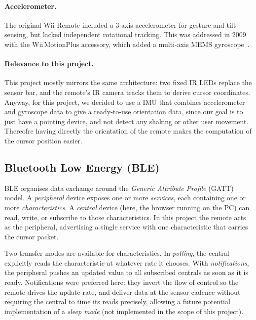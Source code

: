 \documentclass[12pt, a4paper]{article}
\begin{document}
\paragraph{Accelerometer.}
The original Wii Remote included a 3-axis accelerometer for gesture and tilt sensing, but lacked independent rotational tracking. This was addressed in 2009 with the Wii\,MotionPlus accessory, which added a multi-axis MEMS gyroscope~\cite{motionplus_wiki}. 

\paragraph{Relevance to this project.}
This project mostly mirrors the same architecture: two fixed IR LEDs replace the sensor bar, and the remote's IR camera tracks them to derive cursor coordinates. Anyway, for this project, we decided to use a IMU that combines accelerometer and gyroscope data to give a ready-to-use orientation data, since our goal is to just have a pointing device, and not detect any shaking or other user movement. Thereofre having directly the orientation of the remote makes the computation of the cursor position easier.

\subsection{Bluetooth Low Energy (BLE)}

BLE organises data exchange around the \textit{Generic Attribute Profile} (GATT) model. A \textit{peripheral} device exposes one or more \textit{services}, each containing one or more \textit{characteristics}. A \textit{central} device (here, the browser running on the PC) can read, write, or subscribe to those characteristics. In this project the remote acts as the peripheral, advertising a single service with one characteristic that carries the cursor packet.

Two transfer modes are available for characteristics. In \textit{polling}, the central explicitly reads the characteristic at whatever rate it chooses. With \textit{notifications}, the peripheral pushes an updated value to all subscribed centrals as soon as it is ready. Notifications were preferred here: they invert the flow of control so the remote drives the update rate, and deliver data at the sensor cadence without requiring the central to time its reads precisely, allowing a future potential implementation of a \textit{sleep mode} (not implemented in the scope of this project).
\end{document}
